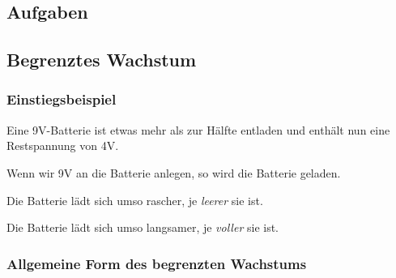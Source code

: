 \subsection*{Aufgaben}



\newpage



\subsection{Begrenztes Wachstum}
\subsubsection{Einstiegsbeispiel}
\begin{center}
\end{center}

Eine 9V-Batterie ist etwas mehr als zur Hälfte entladen und enthält nun eine
Restspannung von 4V.

Wenn wir 9V an die Batterie anlegen, so wird die Batterie geladen.

Die Batterie lädt sich umso rascher, je \textit{leerer} sie ist.

Die Batterie lädt sich umso langsamer, je \textit{voller} sie ist.
\newpage

\subsubsection{Allgemeine Form des begrenzten Wachstums}
\begin{center}
\end{center}


